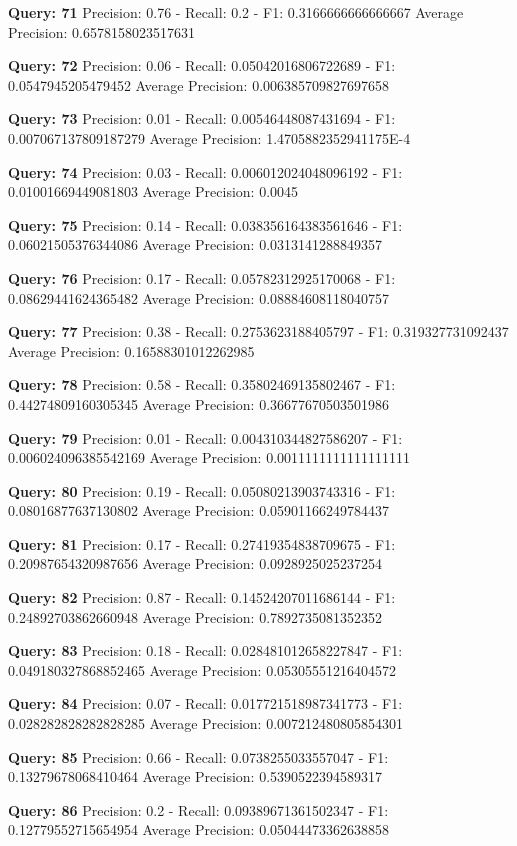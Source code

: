 \documentclass[a4paper, 11pt]{article}
\begin{document}
\textbf{Query: 71}
Precision: 0.76 - Recall: 0.2 - F1: 0.3166666666666667 Average Precision: 0.6578158023517631

\textbf{Query: 72}
Precision: 0.06 - Recall: 0.05042016806722689 - F1: 0.0547945205479452 Average Precision: 0.006385709827697658

\textbf{Query: 73}
Precision: 0.01 - Recall: 0.00546448087431694 - F1: 0.007067137809187279 Average Precision: 1.4705882352941175E-4

\textbf{Query: 74}
Precision: 0.03 - Recall: 0.006012024048096192 - F1: 0.01001669449081803 Average Precision: 0.0045

\textbf{Query: 75}
Precision: 0.14 - Recall: 0.038356164383561646 - F1: 0.06021505376344086 Average Precision: 0.0313141288849357

\textbf{Query: 76}
Precision: 0.17 - Recall: 0.05782312925170068 - F1: 0.08629441624365482 Average Precision: 0.08884608118040757

\textbf{Query: 77}
Precision: 0.38 - Recall: 0.2753623188405797 - F1: 0.319327731092437 Average Precision: 0.16588301012262985

\textbf{Query: 78}
Precision: 0.58 - Recall: 0.35802469135802467 - F1: 0.44274809160305345 Average Precision: 0.36677670503501986

\textbf{Query: 79}
Precision: 0.01 - Recall: 0.004310344827586207 - F1: 0.006024096385542169 Average Precision: 0.0011111111111111111

\textbf{Query: 80}
Precision: 0.19 - Recall: 0.05080213903743316 - F1: 0.08016877637130802 Average Precision: 0.05901166249784437

\textbf{Query: 81}
Precision: 0.17 - Recall: 0.27419354838709675 - F1: 0.20987654320987656 Average Precision: 0.0928925025237254

\textbf{Query: 82}
Precision: 0.87 - Recall: 0.14524207011686144 - F1: 0.24892703862660948 Average Precision: 0.7892735081352352

\textbf{Query: 83}
Precision: 0.18 - Recall: 0.028481012658227847 - F1: 0.049180327868852465 Average Precision: 0.05305551216404572

\textbf{Query: 84}
Precision: 0.07 - Recall: 0.017721518987341773 - F1: 0.028282828282828285 Average Precision: 0.007212480805854301

\textbf{Query: 85}
Precision: 0.66 - Recall: 0.0738255033557047 - F1: 0.13279678068410464 Average Precision: 0.5390522394589317

\textbf{Query: 86}
Precision: 0.2 - Recall: 0.09389671361502347 - F1: 0.12779552715654954 Average Precision: 0.05044473362638858
\end{document}
